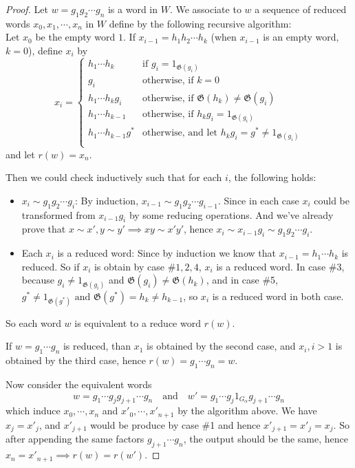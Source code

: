\documentclass[a4paper,titlepage]{article}
\theoremstyle{remark}
\theoremstyle{definition}
\theoremstyle{definition}
\theoremstyle{plain}
\newcommand{\gid}{\mathfrak{G}}
\begin{document}
  \begin{proof}
    Let $w = g_1 g_2 \cdots g_n$ is a word in $W$. We associate to $w$ a sequence of reduced words
    $x_0, x_1, \cdots, x_n$ in $W$ define by the following recursive algorithm: \\
    Let $x_0$ be the empty word $1$. If $x_{i-1} = h_1 h_2 \cdots h_k$ (when $x_{i-1}$ is an empty word, $k = 0$),
    define $x_i$ by
    \[
      x_i = \begin{cases}
        h_1 \cdots h_k & \text{if } g_i = 1_{\gid(g_i)} \\
        g_i & \text{otherwise, if } k = 0 \\
        h_1 \cdots h_k g_i & \text{otherwise, if } \gid(h_k) \neq \gid(g_i) \\
        h_1 \cdots h_{k-1} & \text{otherwise, if } h_k g_i = 1_{\gid(g_i)} \\
        h_1 \cdots h_{k-1} g^* & \text{otherwise, and let } h_k g_i = g^* \neq 1_{\gid(g_i)} \\
      \end{cases}
    \]
    and let $r(w) = x_n$.

    Then we could check inductively such that for each $i$, the following holds:
    \begin{itemize}
      \item $x_i \sim g_1 g_2 \cdots g_i$: By induction, $x_{i-1} \sim g_1 g_2 \cdots g_{i-1}$.
        Since in each case $x_i$ could be transformed from $x_{i-1} g_i$
        by some reducing operations. And we've already prove that $x \sim x', y \sim y' \implies xy \sim x'y'$,
        hence $x_i \sim x_{i-1} g_i \sim g_1 g_2 \cdots g_i$.
      \item Each $x_i$ is a reduced word: Since by induction we know that $x_{i-1} = h_1 \cdots h_k$ is reduced. 
        So if $x_i$ is obtain by case \#$1, 2, 4$, $x_i$ is a reduced word. In case \#3, because $g_i \neq 1_{\gid(g_i)}$
        and $\gid(g_i) \neq \gid(h_k)$, and in case \#5, $g^* \neq 1_{\gid(g^*)} \text{ and } \gid(g^*) = h_k \neq h_{k-1}$,
        so $x_i$ is a reduced word in both case.
    \end{itemize}
    So each word $w$ is equivalent to a reduce word $r(w)$.

    If $w = g_1 \cdots g_n$ is reduced, than $x_1$ is obtained by the second case, and $x_i, i > 1$ is
    obtained by the third case, hence $r(w) = g_1 \cdots g_n = w$.

    Now consider the equivalent words
    \[ w = g_1 \cdots g_j g_{j+1} \cdots g_n \quad\text{and}\quad w' = g_1 \cdots g_j 1_{G_\alpha} g_{j+1} \cdots g_n \]
    which induce $x_0, \cdots, x_n$ and $x'_0, \cdots, x'_{n+1}$ by the algorithm above.
    We have $x_j = x'_j$, and $x'_{j+1}$ would be produce by case \#1 and hence $x'_{j+1} = x'_j = x_j$.
    So after appending the same factors $g_{j+1} \cdots g_n$, the output should be the same, hence
    $x_n = x'_{n+1} \implies r(w) = r(w')$.


\end{proof}
\end{document}
